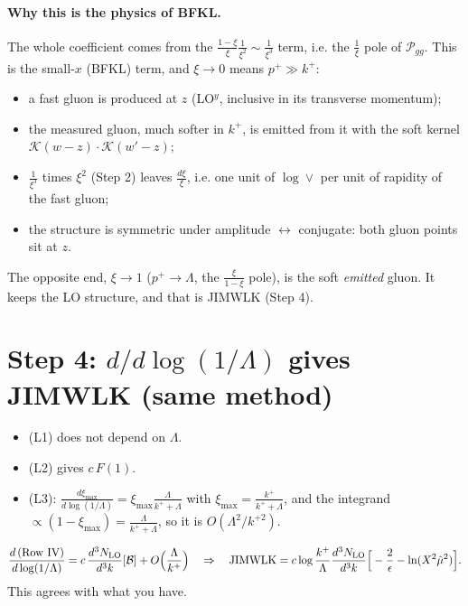 \documentclass[10pt]{article}
\numberwithin{equation}{section}
\newcommand{\NLO}[1]{\frac{d^3N_{#1}}{d^3k}}
\begin{document}
\paragraph{Why this is the physics of BFKL.} The whole coefficient comes from the $\frac{1-\xi}{\xi}\frac{1}{\xi^2}\sim\frac{1}{\xi^3}$ term, i.e. the $\frac{1}{\xi}$ pole of $\mathcal P_{gg}$. This is the small-$x$ (BFKL) term, and $\xi\to0$ means $p^+\gg k^+$:
\begin{itemize}
\item a fast gluon is produced at $z$ (LO$^y$, inclusive in its transverse momentum);
\item the measured gluon, much softer in $k^+$, is emitted from it with the soft kernel $\mathcal K(w-z)\cdot\mathcal K(w'-z)$;
\item $\frac{1}{\xi^3}$ times $\xi^2$ (Step 2) leaves $\frac{d\xi}{\xi}$, i.e. one unit of $\log\vee$ per unit of rapidity of the fast gluon;
\item the structure is symmetric under amplitude $\leftrightarrow$ conjugate: both gluon points sit at $z$.
\end{itemize}
The opposite end, $\xi\to1$ ($p^+\to\Lambda$, the $\frac{\xi}{1-\xi}$ pole), is the soft \emph{emitted} gluon. It keeps the LO structure, and that is JIMWLK (Step 4).

\section{Step 4: $d/d\log(1/\Lambda)$ gives JIMWLK (same method)}
\begin{itemize}
\item (L1) does not depend on $\Lambda$.
\item (L2) gives $c\,F(1)$.
\item (L3): $\frac{d\xi_{\max}}{d\log(1/\Lambda)}=\xi_{\max}\frac{\Lambda}{k^++\Lambda}$ with $\xi_{\max}=\frac{k^+}{k^++\Lambda}$, and the integrand $\propto(1-\xi_{\max})=\frac{\Lambda}{k^++\Lambda}$, so it is $O(\Lambda^2/k^{+2})$.
\end{itemize}
\begin{equation}
\frac{d\,(\text{Row IV})}{d\log(1/\Lambda)}=c\,\NLO{\rm LO}[\mathcal B]+O\Big(\frac{\Lambda}{k^+}\Big)\quad\Rightarrow\quad\text{JIMWLK}=c\log\frac{k^+}{\Lambda}\NLO{\rm LO}\Big[-\frac2\epsilon-\ln(X^2\hat\mu^2)\Big].
\end{equation}
This agrees with what you have.
\end{document}
